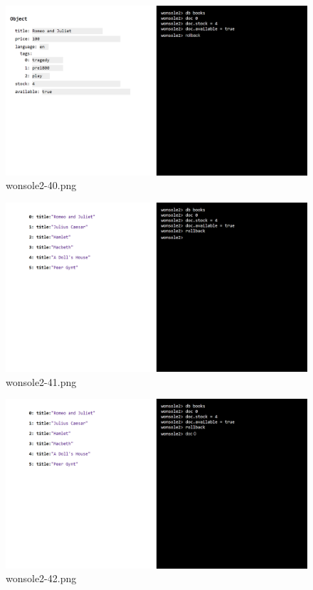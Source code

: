 \begin{figure}
\includegraphics[width=\textwidth]{screenshot/wonsole2/wonsole2-40.png}
\caption{wonsole2-40.png}
\label{wonsole2-40.png}
\end{figure}


\clearpage
\begin{figure}
\includegraphics[width=\textwidth]{screenshot/wonsole2/wonsole2-41.png}
\caption{wonsole2-41.png}
\label{wonsole2-41.png}
\end{figure}


\begin{figure}
\includegraphics[width=\textwidth]{screenshot/wonsole2/wonsole2-42.png}
\caption{wonsole2-42.png}
\label{wonsole2-42.png}
\end{figure}


